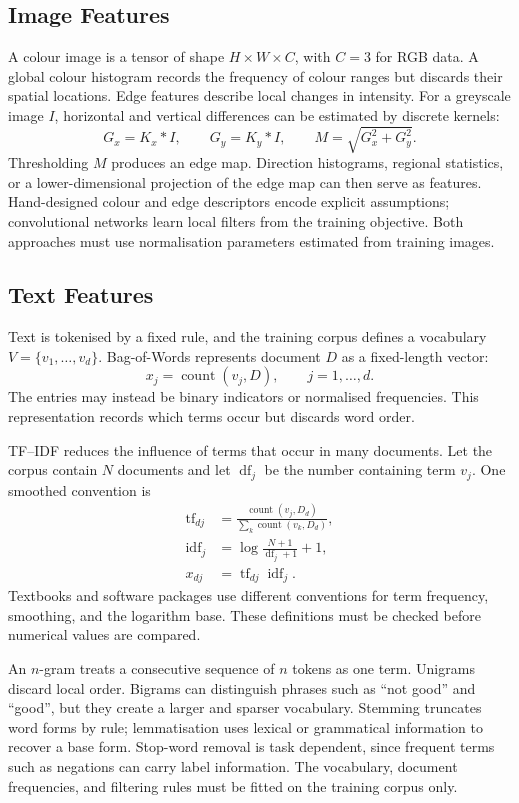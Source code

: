 \subsection{Image Features}

A colour image is a tensor of shape $H\times W\times C$, with $C=3$ for RGB data. A global colour histogram records the frequency of colour ranges but discards their spatial locations. Edge features describe local changes in intensity. For a greyscale image $I$, horizontal and vertical differences can be estimated by discrete kernels:
\[
  G_x=K_x*I,
  \qquad
  G_y=K_y*I,
  \qquad
  M=\sqrt{G_x^2+G_y^2}.
\]
Thresholding $M$ produces an edge map. Direction histograms, regional statistics, or a lower-dimensional projection of the edge map can then serve as features. Hand-designed colour and edge descriptors encode explicit assumptions; convolutional networks learn local filters from the training objective. Both approaches must use normalisation parameters estimated from training images.

\subsection{Text Features}

Text is tokenised by a fixed rule, and the training corpus defines a vocabulary
$V=\{v_1,\ldots,v_d\}$. Bag-of-Words represents document $D$ as a fixed-length vector:
\[
  x_j=\operatorname{count}(v_j,D),
  \qquad j=1,\ldots,d.
\]
The entries may instead be binary indicators or normalised frequencies. This representation records which terms occur but discards word order.

TF--IDF reduces the influence of terms that occur in many documents. Let the corpus contain $N$ documents and let $\operatorname{df}_j$ be the number containing term $v_j$. One smoothed convention is
\begin{align*}
  \operatorname{tf}_{dj}
  &=\frac{\operatorname{count}(v_j,D_d)}
          {\sum_k\operatorname{count}(v_k,D_d)},\\
  \operatorname{idf}_j
  &=\log\frac{N+1}{\operatorname{df}_j+1}+1,\\
  x_{dj}
  &=\operatorname{tf}_{dj}\operatorname{idf}_j.
\end{align*}
Textbooks and software packages use different conventions for term frequency, smoothing, and the logarithm base. These definitions must be checked before numerical values are compared.

An $n$-gram treats a consecutive sequence of $n$ tokens as one term. Unigrams discard local order. Bigrams can distinguish phrases such as ``not good'' and ``good'', but they create a larger and sparser vocabulary. Stemming truncates word forms by rule; lemmatisation uses lexical or grammatical information to recover a base form. Stop-word removal is task dependent, since frequent terms such as negations can carry label information. The vocabulary, document frequencies, and filtering rules must be fitted on the training corpus only.
